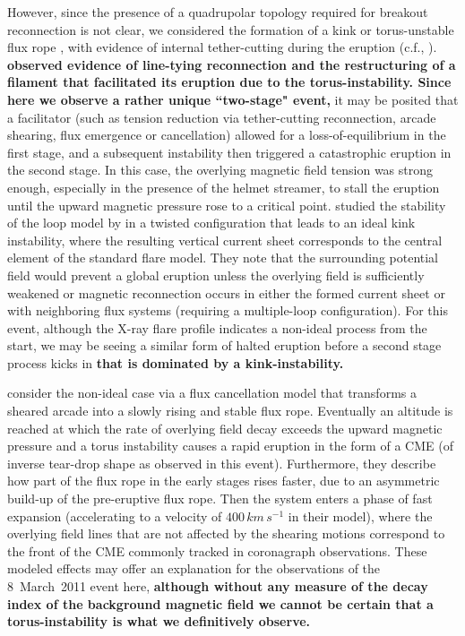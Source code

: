 \documentclass[namedreferences]{solarphysics}
\begin{document}
\begin{article}
However, since the presence of a quadrupolar topology required for breakout reconnection is not clear, we considered the formation of a kink or torus-unstable flux rope \cite{2004A&A...413L..27T,2010ApJ...708..314A}, with evidence of internal tether-cutting during the eruption (c.f., ). {\bf {} observed evidence of line-tying reconnection and the restructuring of a filament that facilitated its eruption due to the torus-instability. Since here we observe a rather unique ``two-stage" event,} it may be posited that a facilitator (such as tension reduction via tether-cutting reconnection, arcade shearing, flux emergence or cancellation) allowed for a loss-of-equilibrium in the first stage, and a subsequent instability then triggered a catastrophic eruption in the second stage. In this case, the overlying magnetic field tension was strong enough, especially in the presence of the helmet streamer, to stall the eruption until the upward magnetic pressure rose to a critical point.  studied the stability of the loop model by  in a twisted configuration that leads to an ideal kink instability, where the resulting vertical current sheet corresponds to the central element of the standard flare model. They note that the surrounding potential field would prevent a global eruption unless the overlying field is sufficiently weakened or magnetic reconnection occurs in either the formed current sheet or with neighboring flux systems (requiring a multiple-loop configuration). For this event, although the X-ray flare profile indicates a non-ideal process from the start, we may be seeing a similar form of halted eruption before a second stage process kicks in {\bf that is dominated by a kink-instability.}

 consider the non-ideal case via a flux cancellation model that transforms a sheared arcade into a slowly rising and stable flux rope. Eventually an altitude is reached at which the rate of overlying field decay exceeds the upward magnetic pressure and a torus instability causes a rapid eruption in the form of a CME (of inverse tear-drop shape as observed in this event). Furthermore, they describe how part of the flux rope in the early stages rises faster, due to an asymmetric build-up of the pre-eruptive flux rope. Then the system enters a phase of fast expansion (accelerating to a velocity of $400\,km\,s^{-1}$ in their model), where the overlying field lines that are not affected by the shearing motions correspond to the front of the CME commonly tracked in coronagraph observations. These modeled effects may offer an explanation for the observations of the 8~March~2011 event here, {\bf although without any measure of the decay index of the background magnetic field we cannot be certain that a torus-instability is what we definitively observe.}



\end{article}
\end{document}
